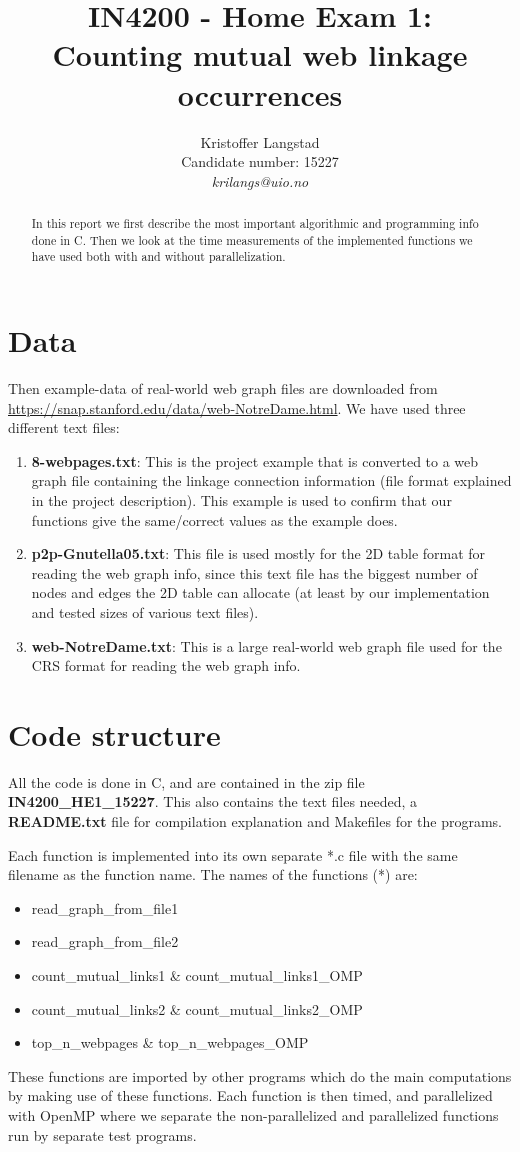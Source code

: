 \documentclass[12pt,a4paper,english]{article}
\title{IN4200 - Home Exam 1:\\ Counting mutual web linkage occurrences}
\date{}
\author{ Kristoffer Langstad\\ Candidate number: 15227\\ \textit{krilangs@uio.no}}
\begin{document}
\maketitle
\begin{abstract}
	In this report we first describe the most important algorithmic and programming info done in C. Then we look at the time measurements of the implemented functions we have used both with and without parallelization.
\end{abstract}

\section{Data}
\label{sect:Data}
Then example-data of real-world web graph files are downloaded from \url{https://snap.stanford.edu/data/web-NotreDame.html}. We have used three different text files:
\begin{enumerate}
	\item \textbf{8-webpages.txt}: This is the project example that is converted to a web graph file containing the linkage connection information (file format explained in the project description). This example is used to confirm that our functions give the same/correct values as the example does.
	\item \textbf{p2p-Gnutella05.txt}: This file is used mostly for the 2D table format for reading the web graph info, since this text file has the biggest number of nodes and edges the 2D table can allocate (at least by our implementation and tested sizes of various text files).
	\item \textbf{web-NotreDame.txt}: This is a large real-world web graph file used for the CRS format for reading the web graph info.
\end{enumerate} 

\section{Code structure}
\label{sect:Code_struct}
All the code is done in C, and are contained in the zip file \textbf{IN4200\_HE1\_15227}. This also contains the text files needed, a \textbf{README.txt} file for compilation explanation and Makefiles for the programs. 

Each function is implemented into its own separate *.c file with the same filename as the function name. The names of the functions (*) are:
\begin{itemize}
	\item read\_graph\_from\_file1
	\item read\_graph\_from\_file2
	\item count\_mutual\_links1 \& count\_mutual\_links1\_OMP
	\item count\_mutual\_links2 \& count\_mutual\_links2\_OMP
	\item top\_n\_webpages \& top\_n\_webpages\_OMP
\end{itemize}
These functions are imported by other programs which do the main computations by making use of these functions. Each function is then timed, and parallelized with OpenMP where we separate the non-parallelized and parallelized functions run by separate test programs.
\end{document}
